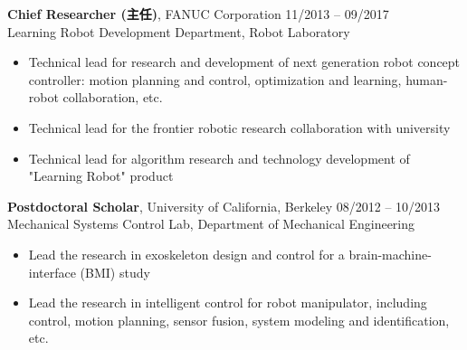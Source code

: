 \documentclass[UTF8,fontset=none]{res}
\begin{document}
\begin{resume}
\begin{list}{}{\setlength\leftmargin{0in}\setlength\topsep{0.15in}}
\vspace{0.05in}
\item {\bf Chief Researcher (主任)}, FANUC Corporation \hfill 11/2013 -- 09/2017\\
Learning Robot Development Department, Robot Laboratory
\begin{itemize}
	\item Technical lead for research and development of next generation robot concept controller: motion planning and control, optimization and learning, human-robot collaboration, etc.
	\item Technical lead for the frontier robotic research collaboration with university
	\item Technical lead for algorithm research and technology development of "Learning Robot" product
\end{itemize}

\vspace{0.05in}
\item    {\bf Postdoctoral Scholar}, University of California, Berkeley    \hfill 08/2012 -- 10/2013\\
Mechanical Systems Control Lab, Department of Mechanical Engineering
\begin{itemize}
	\item Lead the research in exoskeleton design and control for a brain-machine-interface (BMI) study
	\item Lead the research in intelligent control for robot manipulator, including control, motion planning, sensor fusion, system modeling and identification, etc.
\end{itemize}





\end{list}
\end{resume}
\end{document}
